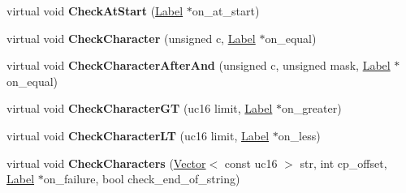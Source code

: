 \begin{DoxyCompactItemize}
\item 
virtual void {\bfseries Check\+At\+Start} (\hyperlink{classv8_1_1internal_1_1_label}{Label} $\ast$on\+\_\+at\+\_\+start)\hypertarget{classv8_1_1internal_1_1_reg_exp_macro_assembler_a_r_m64_a1bfcd2bbf6756e724704afb5ab891769}{}\label{classv8_1_1internal_1_1_reg_exp_macro_assembler_a_r_m64_a1bfcd2bbf6756e724704afb5ab891769}

\item 
virtual void {\bfseries Check\+Character} (unsigned c, \hyperlink{classv8_1_1internal_1_1_label}{Label} $\ast$on\+\_\+equal)\hypertarget{classv8_1_1internal_1_1_reg_exp_macro_assembler_a_r_m64_a36e9329f18fa4c2e79a69aeef80f4366}{}\label{classv8_1_1internal_1_1_reg_exp_macro_assembler_a_r_m64_a36e9329f18fa4c2e79a69aeef80f4366}

\item 
virtual void {\bfseries Check\+Character\+After\+And} (unsigned c, unsigned mask, \hyperlink{classv8_1_1internal_1_1_label}{Label} $\ast$on\+\_\+equal)\hypertarget{classv8_1_1internal_1_1_reg_exp_macro_assembler_a_r_m64_a887aaba0eaff959c5ca976eb38d5726a}{}\label{classv8_1_1internal_1_1_reg_exp_macro_assembler_a_r_m64_a887aaba0eaff959c5ca976eb38d5726a}

\item 
virtual void {\bfseries Check\+Character\+GT} (uc16 limit, \hyperlink{classv8_1_1internal_1_1_label}{Label} $\ast$on\+\_\+greater)\hypertarget{classv8_1_1internal_1_1_reg_exp_macro_assembler_a_r_m64_af627b37fa5f444bb22813eed86209620}{}\label{classv8_1_1internal_1_1_reg_exp_macro_assembler_a_r_m64_af627b37fa5f444bb22813eed86209620}

\item 
virtual void {\bfseries Check\+Character\+LT} (uc16 limit, \hyperlink{classv8_1_1internal_1_1_label}{Label} $\ast$on\+\_\+less)\hypertarget{classv8_1_1internal_1_1_reg_exp_macro_assembler_a_r_m64_a198be2138f84cf7d8ee56f796882305e}{}\label{classv8_1_1internal_1_1_reg_exp_macro_assembler_a_r_m64_a198be2138f84cf7d8ee56f796882305e}

\item 
virtual void {\bfseries Check\+Characters} (\hyperlink{classv8_1_1internal_1_1_vector}{Vector}$<$ const uc16 $>$ str, int cp\+\_\+offset, \hyperlink{classv8_1_1internal_1_1_label}{Label} $\ast$on\+\_\+failure, bool check\+\_\+end\+\_\+of\+\_\+string)\hypertarget{classv8_1_1internal_1_1_reg_exp_macro_assembler_a_r_m64_a768a25dbe284350b48a9bbb35dc5ada3}{}\label{classv8_1_1internal_1_1_reg_exp_macro_assembler_a_r_m64_a768a25dbe284350b48a9bbb35dc5ada3}


\end{DoxyCompactItemize}
